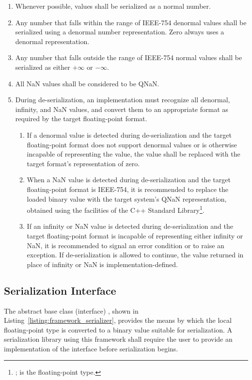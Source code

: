 \begin{enumerate}
\begin{enumerate}
    \item Whenever possible, values shall be serialized as a normal number.
    
    \item Any number that falls within the range of IEEE-754 denormal values shall be serialized using a denormal number representation. Zero always uses a denormal representation.
    
    \item Any number that falls outside the range of IEEE-754 normal values shall be serialized as either $+\infty$ or $-\infty$.
    
    \item All NaN values shall be considered to be QNaN.
    
    \item During de-serialization, an implementation must recognize all denormal, infinity, and NaN values, and convert them to an appropriate format as required by the target floating-point format.
    \begin{enumerate}
      \item If a denormal value is detected during de-serialization and the target floating-point format does not support denormal values or is otherwise incapable of representing the value, the value shall be replaced with the target format's representation of zero.

      \item When a NaN value is detected during de-serialization and the target floating-point format is IEEE-754, it is recommended to replace the loaded binary value with the target system's QNaN representation, obtained using the facilities of the C++ Standard Library\footnote{;  is the floating-point type.}.

      \item If an infinity or NaN value is detected during de-serialization and the target floating-point format is incapable of representing either infinity or NaN, it is recommended to signal an error condition or to raise an exception. If de-serialization is allowed to continue, the value returned in place of infinity or NaN is implementation-defined.
    \end{enumerate}    
  \end{enumerate}
\end{enumerate}

\subsection{Serialization Interface}
The abstract base class (interface) , shown in Listing~\ref{listing:framework_serializer}, provides the means by which the local floating-point type is converted to a binary value suitable for serialization. A serialization library using this framework shall require the user to provide an implementation of the  interface before serialization begins.

